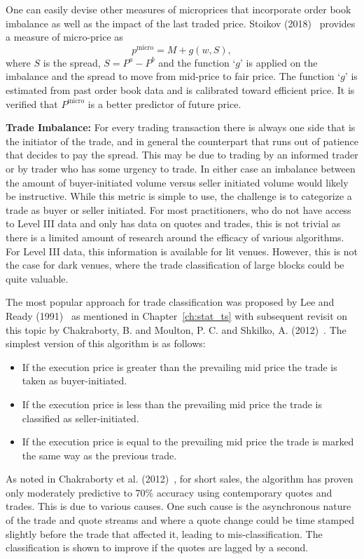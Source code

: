 One can easily devise other measures of microprices that incorporate order book imbalance as well as the impact of the last traded price. Stoikov (2018)~\cite{stoikov18} provides a measure of micro-price as
	\begin{equation} \label{eqn:pmicro}
	p^\text{micro}= M + g(w,S),
	\end{equation}
where $S$ is the spread, $S= P^a - P^b$ and the function `$g$' is applied on the imbalance and the spread to move from mid-price to fair price. The function `$g$' is estimated from past order book data and is calibrated toward efficient price. It is verified that $P^\text{micro}$ is a better predictor of future price. \twomedskip


\noindent\textbf{Trade Imbalance:} For every trading transaction there is always one side that is the initiator of the trade, and in general the counterpart that runs out of patience that decides to pay the spread. This may be due to trading by an informed trader or by trader who has some urgency to trade. In either case an imbalance between the amount of buyer-initiated volume versus seller initiated volume would likely be instructive. While this metric is simple to use, the challenge is to categorize a trade as buyer or seller initiated. For most practitioners, who do not have access to Level III data and only has data on quotes and trades, this is not trivial as there is a limited amount of research around the efficacy of various algorithms. For Level III data, this information is available for lit venues. However, this is not the case for dark venues, where the trade classification of large blocks could be quite valuable.


The most popular approach for trade classification was proposed by Lee and Ready (1991)~\cite{leeready} as mentioned in Chapter~\ref{ch:stat_ts} with subsequent revisit on this topic by Chakraborty, B. and Moulton, P. C. and Shkilko, A. (2012)~\cite{chakrabarty2012short}. The simplest version of this algorithm is as follows:
        \begin{itemize}
        \item If the execution price is greater than the prevailing mid price the trade is taken as buyer-initiated.
        \item If the execution price is less than the prevailing mid price the trade is classified as seller-initiated.
        \item If the execution price is equal to the prevailing mid price the trade is marked the same way as the previous trade.
        \end{itemize}
As noted in Chakraborty et al. (2012)~\cite{chakrabarty2012short}, for short sales, the algorithm has proven only moderately predictive to 70\% accuracy using contemporary quotes and trades. This is due to various causes. One such cause is the asynchronous nature of the trade and quote streams and where a quote change could be time stamped slightly before the trade that affected it, leading to mis-classification. The classification is shown to improve if the quotes are lagged by a second.



